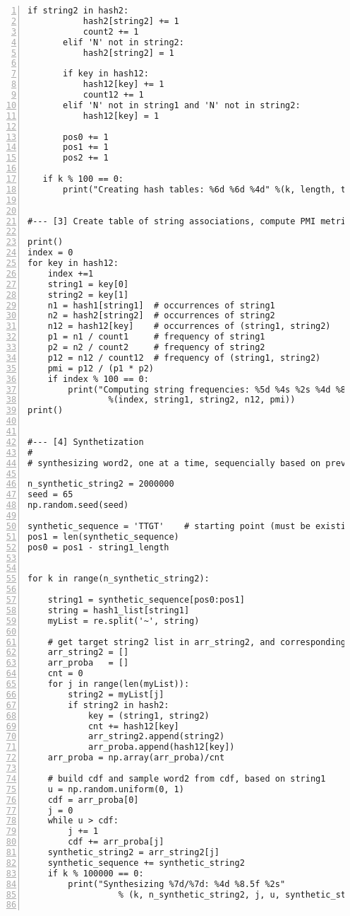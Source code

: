 \documentclass[oneside,10pt]{book}
\begin{document}
\begin{lstlisting}[numbers=left]
       if string2 in hash2:
           hash2[string2] += 1
           count2 += 1
       elif 'N' not in string2:
           hash2[string2] = 1

       if key in hash12:
           hash12[key] += 1
           count12 += 1
       elif 'N' not in string1 and 'N' not in string2:
           hash12[key] = 1

       pos0 += 1
       pos1 += 1
       pos2 += 1

   if k % 100 == 0:
       print("Creating hash tables: %6d %6d %4d" %(k, length, type))


#--- [3] Create table of string associations, compute PMI metric 

print()
index = 0
for key in hash12:
    index +=1
    string1 = key[0]
    string2 = key[1]
    n1 = hash1[string1]  # occurrences of string1 
    n2 = hash2[string2]  # occurrences of string2 
    n12 = hash12[key]    # occurrences of (string1, string2) 
    p1 = n1 / count1     # frequency of string1
    p2 = n2 / count2     # frequency of string2
    p12 = n12 / count12  # frequency of (string1, string2)
    pmi = p12 / (p1 * p2)
    if index % 100 == 0:
        print("Computing string frequencies: %5d %4s %2s %4d %8.5f" 
                %(index, string1, string2, n12, pmi))
print()


#--- [4] Synthetization
#
# synthesizing word2, one at a time, sequencially based on previous word1

n_synthetic_string2 = 2000000
seed = 65
np.random.seed(seed)

synthetic_sequence = 'TTGT'    # starting point (must be existing string1)
pos1 = len(synthetic_sequence)
pos0 = pos1 - string1_length 


for k in range(n_synthetic_string2):

    string1 = synthetic_sequence[pos0:pos1]
    string = hash1_list[string1]
    myList = re.split('~', string)

    # get target string2 list in arr_string2, and corresponding probabilities in arr_proba
    arr_string2 = []
    arr_proba   = []
    cnt = 0
    for j in range(len(myList)):
        string2 = myList[j]
        if string2 in hash2:
            key = (string1, string2)
            cnt += hash12[key]
            arr_string2.append(string2)
            arr_proba.append(hash12[key])
    arr_proba = np.array(arr_proba)/cnt

    # build cdf and sample word2 from cdf, based on string1 
    u = np.random.uniform(0, 1) 
    cdf = arr_proba[0]
    j = 0
    while u > cdf:
        j += 1
        cdf += arr_proba[j]
    synthetic_string2 = arr_string2[j]
    synthetic_sequence += synthetic_string2
    if k % 100000 == 0:
        print("Synthesizing %7d/%7d: %4d %8.5f %2s" 
                  % (k, n_synthetic_string2, j, u, synthetic_string2))


\end{lstlisting}
\end{document}
